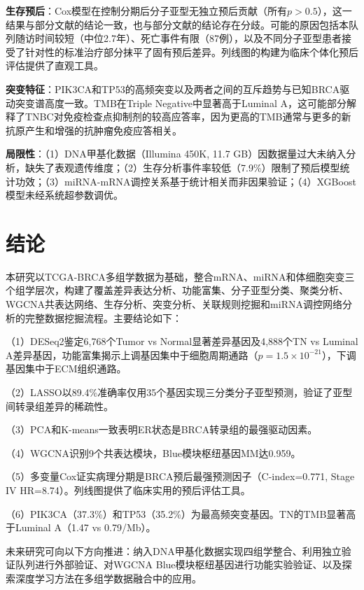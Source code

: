 \documentclass[12pt,a4paper]{ctexart}
\begin{document}
\textbf{生存预后}：Cox模型在控制分期后分子亚型无独立预后贡献（所有$p>0.5$），这一结果与部分文献的结论一致，也与部分文献的结论存在分歧。可能的原因包括本队列随访时间较短（中位2.7年）、死亡事件有限（87例），以及不同分子亚型患者接受了针对性的标准治疗部分抹平了固有预后差异。列线图的构建为临床个体化预后评估提供了直观工具。

\textbf{突变特征}：PIK3CA和TP53的高频突变以及两者之间的互斥趋势与已知BRCA驱动突变谱高度一致。TMB在Triple Negative中显著高于Luminal A，这可能部分解释了TNBC对免疫检查点抑制剂的较高应答率，因为更高的TMB通常与更多的新抗原产生和增强的抗肿瘤免疫应答相关。

\textbf{局限性}：（1）DNA甲基化数据（Illumina 450K, 11.7 GB）因数据量过大未纳入分析，缺失了表观遗传维度；（2）生存分析事件率较低（7.9\%）限制了预后模型统计功效；（3）miRNA-mRNA调控关系基于统计相关而非因果验证；（4）XGBoost模型未经系统超参数调优。

\section{结论}

本研究以TCGA-BRCA多组学数据为基础，整合mRNA、miRNA和体细胞突变三个组学层次，构建了覆盖差异表达分析、功能富集、分子亚型分类、聚类分析、WGCNA共表达网络、生存分析、突变分析、关联规则挖掘和miRNA调控网络分析的完整数据挖掘流程。主要结论如下：

（1）DESeq2鉴定6,768个Tumor vs Normal显著差异基因及4,888个TN vs Luminal A差异基因，功能富集揭示上调基因集中于细胞周期通路（$p=1.5\times10^{-21}$），下调基因集中于ECM组织通路。

（2）LASSO以89.4\%准确率仅用35个基因实现三分类分子亚型预测，验证了亚型间转录组差异的稀疏性。

（3）PCA和K-means一致表明ER状态是BRCA转录组的最强驱动因素。

（4）WGCNA识别9个共表达模块，Blue模块枢纽基因MM达0.959。

（5）多变量Cox证实病理分期是BRCA预后最强预测因子（C-index=0.771, Stage IV HR=8.74）。列线图提供了临床实用的预后评估工具。

（6）PIK3CA（37.3\%）和TP53（35.2\%）为最高频突变基因。TN的TMB显著高于Luminal A（1.47 vs 0.79/Mb）。

未来研究可向以下方向推进：纳入DNA甲基化数据实现四组学整合、利用独立验证队列进行外部验证、对WGCNA Blue模块枢纽基因进行功能实验验证、以及探索深度学习方法在多组学数据融合中的应用。

\printbibliography
\end{document}
